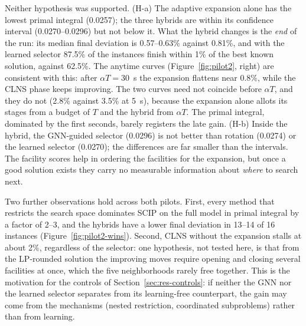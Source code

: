 Neither hypothesis was supported. (H-a) The adaptive expansion alone has the lowest primal
integral (0.0257); the three hybrids are within its confidence interval (0.0270--0.0296) but not
below it. What the hybrid changes is the \emph{end} of the run: its median final deviation is
0.57--0.63\% against 0.81\%, and with the learned selector 87.5\% of the instances finish within
1\% of the best known solution, against 62.5\%. The anytime curves (Figure~\ref{fig:pilot2},
right) are consistent with this: after $\alpha T=30$~s the expansion flattens near 0.8\%, while
the CLNS phase keeps improving. The two curves need not coincide before $\alpha T$, and they do
not (2.8\% against 3.5\% at 5~s), because the expansion alone allots its stages from a budget of
$T$ and the hybrid from $\alpha T$. The primal integral, dominated by the first seconds, barely
registers the late gain. (H-b) Inside the hybrid, the GNN-guided selector (0.0296) is not better than
rotation (0.0274) or the learned selector (0.0270); the differences are far smaller than the
intervals. The facility scores help in ordering the facilities for the expansion, but once a
good solution exists they carry no measurable information about \emph{where} to search next.

Two further observations hold across both pilots. First, every method that restricts the search
space dominates SCIP on the full model in primal integral by a factor of 2--3, and the hybrids have a lower final deviation in 13--14 of 16 instances (Figure~\ref{fig:pilot2-wins}). Second, CLNS
without the expansion stalls at about 2\%, regardless of the selector: one hypothesis, not tested here, is
that from the LP-rounded solution the improving moves require opening and closing several
facilities at once, which the five neighborhoods rarely free together. This is the motivation for the controls of
Section~\ref{sec:res-controls}: if neither the GNN nor the learned selector separates from its
learning-free counterpart, the gain may come from the mechanisms (nested restriction,
coordinated subproblems) rather than from learning.

